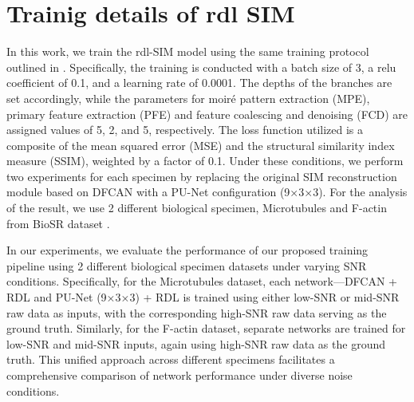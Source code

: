 \documentclass[11pt,
  paper=a4, 
  bibliography=totocnumbered,
	captions=tableheading,
	BCOR=10mm
]{scrreprt}
\theoremstyle{definition}
\begin{document}
\section{Trainig details of rdl SIM}
\label{sec:training-details-rdl-sim}

In this work, we train the rdl-SIM model using the same training protocol outlined in \cite{rdl_main}. 
Specifically, the training is conducted with a batch size of 3, a relu coefficient of 0.1, and a learning rate of 0.0001. 
The depths of the branches are set accordingly, while the parameters for moiré pattern extraction (MPE), primary 
feature extraction (PFE) and feature coalescing and denoising (FCD) are assigned values of 5, 2, and 5, respectively. 
The loss function utilized is a composite of 
the mean squared error (MSE) and the structural similarity index measure (SSIM), weighted by a factor of 0.1. Under 
these conditions, we perform two experiments for each specimen by replacing the original SIM reconstruction module 
based on DFCAN with a PU-Net configuration (9×3×3). For the analysis of the result, we use 2 different biological specimen,
 Microtubules and F-actin from BioSR dataset \cite{BioSR}.

 \vspace{1cm}
\noindent
 In our experiments, we evaluate the performance of our proposed training pipeline using 2 different biological specimen datasets 
 under varying SNR conditions. Specifically, for the Microtubules dataset, each network—DFCAN + RDL and PU-Net (9×3×3) + RDL is 
 trained using either low-SNR or mid-SNR raw data as inputs, with the corresponding high-SNR raw data serving as the ground truth. 
 Similarly, for the F-actin dataset, separate networks are trained for low-SNR and mid-SNR inputs, again using high-SNR raw data as 
 the ground truth. This unified approach across different specimens facilitates a comprehensive comparison of network performance under diverse noise conditions.





\end{document}
